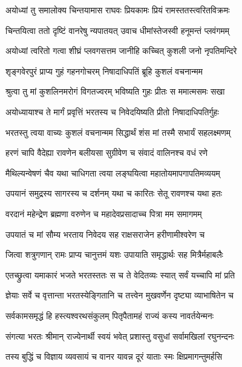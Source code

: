 
\twolineshloka
{अयोध्यां तु समालोक्य चिन्तयामास राघवः}
{प्रियकामः प्रियं रामस्ततस्त्वरितविक्रमः} %

\twolineshloka
{चिन्तयित्वा ततो दृष्टिं वानरेषु न्यपातयत्}
{उवाच धीमांस्तेजस्वी हनूमन्तं प्लवंगमम्} %

\twolineshloka
{अयोध्यां त्वरितो गत्वा शीघ्रं प्लवगसत्तम}
{जानीहि कच्चित् कुशली जनो नृपतिमन्दिरे} %

\twolineshloka
{शृङ्गवेरपुरं प्राप्य गुहं गहनगोचरम्}
{निषादाधिपतिं ब्रूहि कुशलं वचनान्मम} %

\twolineshloka
{श्रुत्वा तु मां कुशलिनमरोगं विगतज्वरम्}
{भविष्यति गुहः प्रीतः स ममात्मसमः सखा} %

\twolineshloka
{अयोध्यायाश्च ते मार्गं प्रवृत्तिं भरतस्य च}
{निवेदयिष्यति प्रीतो निषादाधिपतिर्गुहः} %

\twolineshloka
{भरतस्तु त्वया वाच्यः कुशलं वचनान्मम}
{सिद्धार्थं शंस मां तस्मै सभार्यं सहलक्ष्मणम्} %

\twolineshloka
{हरणं चापि वैदेह्या रावणेन बलीयसा}
{सुग्रीवेण च संवादं वालिनश्च वधं रणे} %

\twolineshloka
{मैथिल्यन्वेषणं चैव यथा चाधिगता त्वया}
{लङ्घयित्वा महातोयमापगापतिमव्ययम्} %

\twolineshloka
{उपयानं समुद्रस्य सागरस्य च दर्शनम्}
{यथा च कारितः सेतू रावणश्च यथा हतः} %

\twolineshloka
{वरदानं महेन्द्रेण ब्रह्मणा वरुणेन च}
{महादेवप्रसादाच्च पित्रा मम समागमम्} %

\twolineshloka
{उपयातं च मां सौम्य भरताय निवेदय}
{सह राक्षसराजेन हरीणामीश्वरेण च} %

\twolineshloka
{जित्वा शत्रुगणान् रामः प्राप्य चानुत्तमं यशः}
{उपायाति समृद्धार्थः सह मित्रैर्महाबलैः} %

\twolineshloka
{एतच्छ्रुत्वा यमाकारं भजते भरतस्ततः}
{स च ते वेदितव्यः स्यात् सर्वं यच्चापि मां प्रति} %

\twolineshloka
{ज्ञेयाः सर्वे च वृत्तान्ता भरतस्येङ्गितानि च}
{तत्त्वेन मुखवर्णेन दृष्ट्या व्याभाषितेन च} %

\twolineshloka
{सर्वकामसमृद्धं हि हस्त्यश्वरथसंकुलम्}
{पितृपैतामहं राज्यं कस्य नावर्तयेन्मनः} %

\twolineshloka
{संगत्या भरतः श्रीमान् राज्येनार्थी स्वयं भवेत्}
{प्रशास्तु वसुधां सर्वामखिलां रघुनन्दनः} %

\twolineshloka
{तस्य बुद्धिं च विज्ञाय व्यवसायं च वानर}
{यावन्न दूरं याताः स्मः क्षिप्रमागन्तुमर्हसि} %

